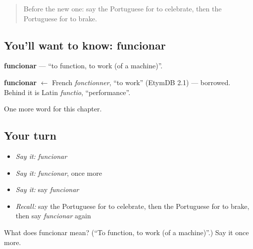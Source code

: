 \begin{quote}
Before the new one: say the Portuguese for to celebrate, then the Portuguese for to brake.
\end{quote}

\subsection*{You'll want to know: funcionar}
\textbf{funcionar} — \textquotedblleft{}to function, to work (of a machine)\textquotedblright{}.

\begin{cousinweb}
\textbf{funcionar} $\leftarrow$ French \emph{fonctionner}, \textquotedblleft{}to work\textquotedblright{} (EtymDB 2.1) — borrowed. Behind it is Latin \emph{functio}, \textquotedblleft{}performance\textquotedblright{}.
\end{cousinweb}

\begin{grammarlens}[title={What you've built}]
One more word for this chapter.
\end{grammarlens}

\subsection*{Your turn}
\begin{itemize}
\raggedright
  \item \emph{Say it:} \emph{funcionar}
  \item \emph{Say it:} \emph{funcionar}, once more
  \item \emph{Say it:} say \emph{funcionar}
  \item \emph{Recall:} say the Portuguese for to celebrate, then the Portuguese for to brake, then say \emph{funcionar} again
\end{itemize}

\begin{tcolorbox}[breakable,colback=teal!4,colframe=teal!35!black,title={Before you move on}]
What does funcionar mean? (\textquotedblleft{}To function, to work (of a machine)\textquotedblright{}.) Say it once more.
\end{tcolorbox}
